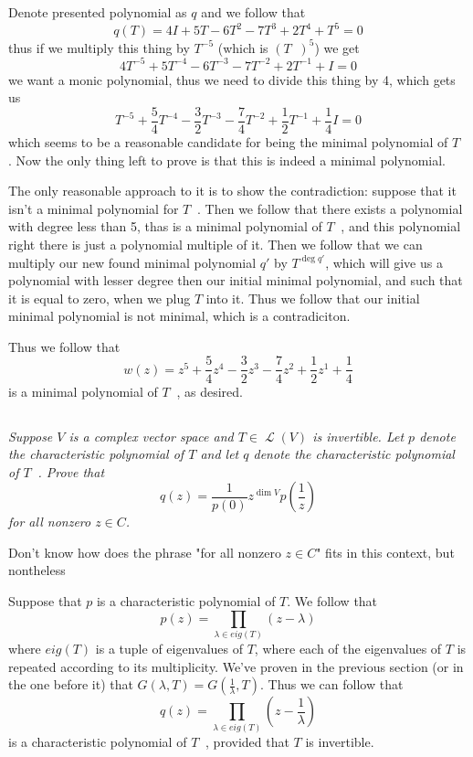 \documentclass[11pt,oneside,titlepage]{book}
\DeclareMathOperator \map {\mathcal {L}}
\DeclareMathOperator \inv {^{-1}}
\begin{document}
Denote presented polynomial as $q$ and we follow that 
$$q(T) = 4I + 5T - 6T^2 - 7T^3 + 2T^4 + T^5 = 0 $$
thus if we multiply this thing by $T^{-5}$ (which is $(T\inv)^5$) we get
$$4T^{-5} + 5T^{-4} - 6T^{-3} - 7T^{-2} + 2T^{-1} + I = 0 $$
we want a monic polynomial, thus  we need to divide this thing by 4, which gets us
$$T^{-5} + \frac{5}{4}T^{-4} - \frac{3}{2}T^{-3} -
\frac{7}{4}T^{-2} + \frac{1}{2}T^{-1} + \frac{1}{4}I = 0 $$
which seems to be a reasonable candidate for being the minimal polynomial of $T\inv$.
Now the only thing left to prove is that this is indeed a minimal polynomial.

The only reasonable approach to it is to show the contradiction: suppose that
it isn't a minimal polynomial for $T\inv$. Then we follow that there exists a polynomial with
degree less than 5, thas is a minimal polynomial of $T\inv$, and this polynomial right there is
just a polynomial multiple of it. Then we follow that we can multiply
our new found minimal polynomial $q'$  by $T^{\deg q'}$, which will give
us a polynomial with lesser
degree then our initial minimal polynomial, and such that it is equal to zero, when we plug $T$
into it. Thus we follow that our initial minimal polynomial is not minimal,
which is a contradiciton.

Thus we follow that 
$$w(z) = z^{5} + \frac{5}{4}z^{4} - \frac{3}{2}z^{3}  -
\frac{7}{4}z^{2} + \frac{1}{2}z^{1} + \frac{1}{4}$$
is a minimal polynomial of $T\inv$, as desired.

\subsection{}

\textit{Suppose $V$ is a complex vector space and $T \in \map(V)$ is invertible. Let
  $p$ denote the characteristic polynomial of $T$ and let $q$ denote the
  characteristic polynomial of $T\inv$. Prove that
  $$q(z) = \frac{1}{p(0)} z^{\dim V} p(\frac{1}{z})$$
  for all nonzero $z \in C$.
}

Don't know how does the phrase "for all nonzero $z \in C$" fits in this context, but nontheless

Suppose that $p$ is a characteristic polynomial of $T$. We follow that
$$p(z) = \prod_{\lambda \in eig(T)}{(z - \lambda)}$$
where $eig(T)$ is a tuple of eigenvalues of $T$, where each of the eigenvalues of $T$
is repeated according to its multiplicity. We've proven in the previous section
(or in the  one before it) that $G(\lambda, T) = G(\frac{1}{\lambda}, T)$. Thus we can follow that
$$q(z) = \prod_{\lambda \in eig(T)}{(z - \frac{1}{\lambda})}$$
is a characteristic polynomial of $T\inv$, provided that $T$ is invertible.
\end{document}
